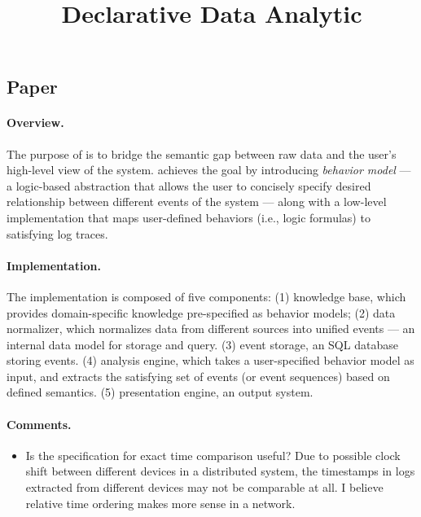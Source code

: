 \documentclass{article}
\begin{document}


\title{Declarative Data Analytic}
\author{}

\maketitle

\section{\saf}
\label{sec:saf}

\subsection{Paper}
\label{sec:safpaper}

\paragraph{Overview.}
The purpose of \saf\cite{arun2011} is to bridge the semantic gap between raw
data and the user's high-level view of the system. \saf achieves the goal by
introducing {\em behavior model} --- a logic-based abstraction that allows the user to
concisely specify desired relationship between different events of the system --- along
with a low-level implementation that maps user-defined behaviors (i.e., logic
formulas) to satisfying log traces. 

\paragraph{Implementation.}
The implementation is composed of five components: 
(1) knowledge base, which provides domain-specific knowledge pre-specified as behavior
models; 
(2) data normalizer, which normalizes data from different sources into unified
events --- an internal data model for storage and query.
(3) event storage, an SQL database storing events.
(4) analysis engine, which takes a user-specified behavior model as input, and
extracts the satisfying set of events (or event sequences) based on defined
semantics.
(5) presentation engine, an output system.

\paragraph{Comments.}
\begin{itemize}
\item Is the specification for exact time comparison useful? Due to possible
  clock shift between different devices in a distributed system, the timestamps
  in logs extracted from different devices may not be comparable at all. I
  believe relative time ordering makes more sense in a network.
\end{itemize}
\end{document}
